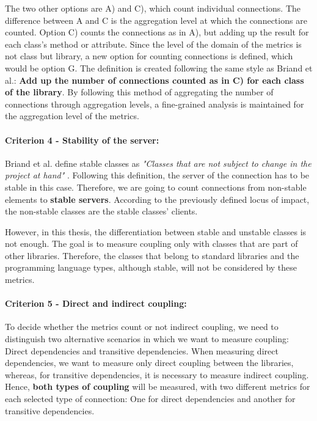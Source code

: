 The two other options are A) and C), which count individual connections. The difference between A and C is the aggregation level at which the connections are counted. Option C) counts the connections as in A), but adding up the result for each class's method or attribute. Since the level of the domain of the metrics is not class but library, a new option for counting connections is defined, which would be option G. The definition is created following the same style as Briand et al.: \textbf{Add up the number of connections counted as in C) for each class of the library}. By following this method of aggregating the number of connections through aggregation levels, a fine-grained analysis is maintained for the aggregation level of the metrics.

\paragraph{Criterion 4 - Stability of the server:}
Briand et al. define stable classes as \textit{"Classes that are not subject to change in the project at hand"} \cite{briand1999unified}. Following this definition, the server of the connection has to be stable in this case. Therefore, we are going to count connections from non-stable elements to \textbf{stable servers}. According to the previously defined locus of impact, the non-stable classes are the stable classes' clients.

However, in this thesis, the differentiation between stable and unstable classes is not enough. The goal is to measure coupling only with classes that are part of other libraries. Therefore, the classes that belong to standard libraries and the programming language types, although stable, will not be considered by these metrics.

\paragraph{Criterion 5 - Direct and indirect coupling:}
To decide whether the metrics count or not indirect coupling, we need to distinguish two alternative scenarios in which we want to measure coupling: Direct dependencies and transitive dependencies. When measuring direct dependencies, we want to measure only direct coupling between the libraries, whereas, for transitive dependencies, it is necessary to measure indirect coupling. Hence, \textbf{both types of coupling} will be measured, with two different metrics for each selected type of connection: One for direct dependencies and another for transitive dependencies.

